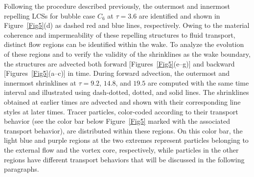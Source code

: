 \documentclass[aps,prfluids,reprint,nofootinbib,onecolumn,groupedaddress,showkeys]{revtex4-2}
\begin{document}
	Following the procedure described previously, the outermost and innermost repelling LCSs for bubble case $C_6$ at $\tau = 3.6$ are identified and shown in Figure~\ref{Fig5}(d) as dashed red and blue lines, respectively. Owing to the material coherence and impermeability of these repelling structures to fluid transport, distinct flow regions can be identified within the wake. To analyze the evolution of these regions and to verify the validity of the shrinklines as the wake boundary, the structures are advected both forward [Figures~\ref{Fig5}(e–g)] and backward [Figures~\ref{Fig5}(a–c)] in time. During forward advection, the outermost and innermost shrinklines at $\tau = 9.2$, $14.8$, and $19.5$ are computed with the same time interval and illustrated using dash-dotted, dotted, and solid lines. The shrinklines obtained at earlier times are advected and shown with their corresponding line styles at later times. Tracer particles, color-coded according to their transport behavior (see the color bar below Figure~\ref{Fig5} marked with the associated transport behavior), are distributed within these regions. On this color bar, the light blue and purple regions at the two extremes represent particles belonging to the external flow and the vortex core, respectively, while particles in the other regions have different transport behaviors that will be discussed in the following paragraphs.
	
\end{document}
